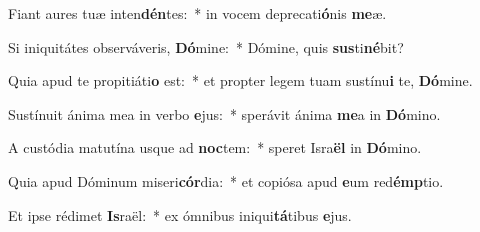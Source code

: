 \item Fiant aures tuæ inten\textbf{dén}tes:~* in vocem deprecati\textbf{ó}nis \textbf{me}æ.
\item Si iniquitátes observáveris, \textbf{Dó}mine:~* Dómine, quis \textbf{sus}ti\textbf{né}bit?
\item Quia apud te propitiáti\textbf{o} est:~* et propter legem tuam sustínu\textbf{i} te, \textbf{Dó}mine.
\item Sustínuit ánima mea in verbo \textbf{e}jus:~* sperávit ánima \textbf{me}a in \textbf{Dó}mino.
\item A custódia matutína usque ad \textbf{noc}tem:~* speret Isra\textbf{ël} in \textbf{Dó}mino.
\item Quia apud Dóminum miseri\textbf{cór}dia:~* et copiósa apud \textbf{e}um red\textbf{émp}tio.
\item Et ipse rédimet \textbf{Is}raël:~* ex ómnibus iniqui\textbf{tá}tibus \textbf{e}jus.
